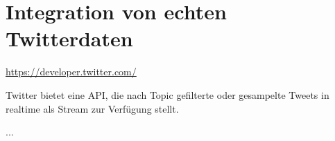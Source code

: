 \chapter{Integration von echten Twitterdaten}
\label{TwitterIntegration}



\url{https://developer.twitter.com/}

Twitter bietet eine API, die nach Topic gefilterte oder gesampelte Tweets in realtime als Stream zur Verfügung stellt.

...